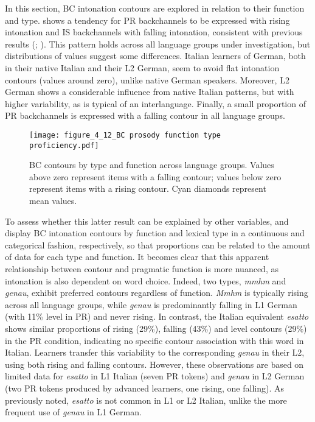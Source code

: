 \label{sec:4.3.7}
In this section, BC intonation contours are explored in relation to their function and type.  shows a tendency for PR backchannels to be expressed with rising intonation and IS backchannels with falling intonation, consistent with previous results (\citealt{Savino2010,Savino2011,Savino2014}; \citealt{Wehrle2023}). This pattern holds across all language groups under investigation, but distributions of values suggest some differences. Italian learners of German, both in their native Italian and their L2 German, seem to avoid flat intonation contours (values around zero), unlike native German speakers. Moreover, L2 German shows a considerable influence from native Italian patterns, but with higher variability, as is typical of an interlanguage. Finally, a small proportion of PR backchannels is expressed with a falling contour in all language groups.

\begin{figure}[b]
\texttt{[image: figure\_4\_12\_BC prosody function type proficiency.pdf]}
\caption{BC contours by type and function across language groups. Values above zero represent items with a falling contour; values below zero represent items with a rising contour. Cyan diamonds represent mean values.}
\label{fig:4.12}
\end{figure}
To assess whether this latter result can be explained by other variables,  and  display BC intonation contours by function and lexical type in a continuous and categorical fashion, respectively, so that proportions can be related to the amount of data for each type and function. It becomes clear that this apparent relationship between contour and pragmatic function is more nuanced, as intonation is also dependent on word choice. Indeed, two types, \textit{mmhm} and \textit{genau}, exhibit preferred contours regardless of function. \textit{Mmhm} is typically rising across all language groups, while \textit{genau} is predominantly falling in L1 German (with 11\% level in PR) and never rising. In contrast, the Italian equivalent \textit{esatto} shows similar proportions of rising (29\%), falling (43\%) and level contours (29\%) in the PR condition, indicating no specific contour association with this word in Italian. Learners transfer this variability to the corresponding \textit{genau} in their L2, using both rising and falling contours. However, these observations are based on limited data for \textit{esatto} in L1 Italian (seven PR tokens) and \textit{genau} in L2 German (two PR tokens produced by advanced learners, one rising, one falling). As previously noted, \textit{esatto} is not common in L1 or L2 Italian, unlike the more frequent use of \textit{genau} in L1 German.


